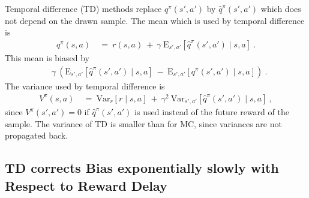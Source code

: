 \documentclass{article}
\newcommand\EXP{\mathbf{\mathrm{E}}}
\newcommand\VAR{\mathbf{\mathrm{Var}}}
\begin{document}
\begin{appendices}
Temporal difference (TD) methods replace
$q^\pi(s', a')$ by $\hat{q}^\pi(s', a')$ which does not depend on
the drawn sample.
The mean which is used by temporal difference is
\begin{align}
  q^\pi(s,a) \ &= \  
  r(s,a) \ + \ \gamma \
  \EXP_{s',a'} \left[\hat{q}^\pi(s', a') \mid s,a\right]\ . 
\end{align}
This mean is biased by
\begin{align}
  &\gamma \ \left(
    \EXP_{s',a'} \left[\hat{q}^\pi(s', a') \mid s,a\right]
    \ - \
     \EXP_{s',a'} \left[q^\pi(s', a') \mid s,a\right] 
  \right) \ . 
\end{align}
The variance used by temporal difference is
\begin{align}
  V^{\pi}(s,a) \ &= \ \VAR_r \left[ r \mid s,a \right] \ + \ \gamma^2  \  
    \VAR_{s',a'} \left[\hat{q}^\pi(s', a') \mid s,a\right] \ ,  
\end{align}
since $V^{\pi}(s',a')=0$ if $\hat{q}^\pi(s', a')$ is used instead of
the future reward of the sample.
The variance of TD is smaller than for MC, since variances are not
propagated back.




\subsection{TD corrects Bias exponentially slowly with Respect to
  Reward Delay}
\label{sec:ATDslow}




\end{appendices}
\end{document}

